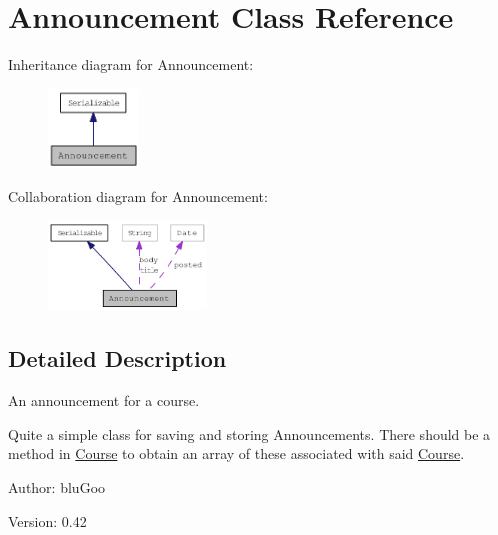 \hypertarget{classAnnouncement}{
\section{Announcement Class Reference}
\label{classAnnouncement}
}
Inheritance diagram for Announcement:\nopagebreak
\begin{figure}[H]
\begin{center}
\leavevmode
\includegraphics[width=68pt]{classAnnouncement__inherit__graph}
\end{center}
\end{figure}
Collaboration diagram for Announcement:\nopagebreak
\begin{figure}[H]
\begin{center}
\leavevmode
\includegraphics[width=119pt]{classAnnouncement__coll__graph}
\end{center}
\end{figure}


\subsection{Detailed Description}
An announcement for a course. 

Quite a simple class for saving and storing Announcements. There should be a method in \hyperlink{classCourse}{Course} to obtain an array of these associated with said \hyperlink{classCourse}{Course}. \begin{Desc}
\item[Author:]bluGoo \end{Desc}
\begin{Desc}
\item[Version:]0.42 \end{Desc}


